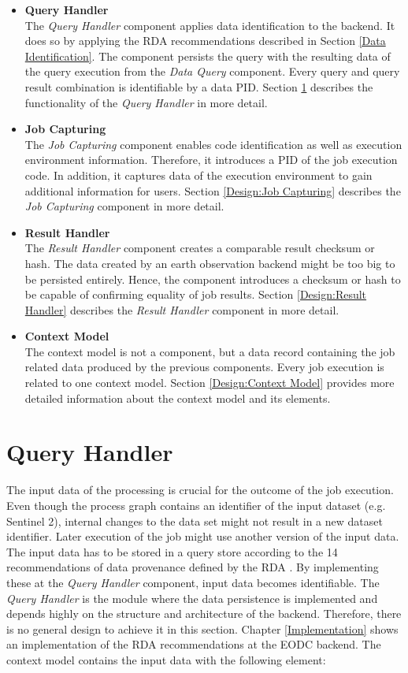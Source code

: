 \documentclass[draft,final]{vutinfth} %
\begin{document}
 \begin{itemize}
	\item \textbf{Query Handler} \\
	The \textit{Query Handler} component applies data identification to the backend. It does so by applying the RDA recommendations described in Section \ref{Data Identification}. The component persists the query with the resulting data of the query execution from the \textit{Data Query} component. Every query and query result combination is identifiable by a data PID. Section \ref{Design:Data Identification} describes the functionality of the \textit{Query Handler} in more detail.     
	\item \textbf{Job Capturing} \\ 
	The \textit{Job Capturing} component enables code identification as well as execution environment information. Therefore, it introduces a PID of the job execution code. In addition, it captures data of the execution environment to gain additional information for users. Section \ref{Design:Job Capturing} describes the \textit{Job Capturing} component in more detail.
	\item \textbf{Result Handler} \\
	The \textit{Result Handler} component creates a comparable result checksum or hash. The data created by an earth observation backend might be too big to be persisted entirely. Hence, the component introduces a checksum or hash to be capable of confirming equality of job results. Section \ref{Design:Result Handler} describes the \textit{Result Handler} component in more detail.   
	\item \textbf{Context Model} \\ 
	The context model is not a component, but a data record containing the job related data produced by the previous components. Every job execution is related to one context model. Section \ref{Design:Context Model} provides more detailed information about the context model and its elements. 
\end{itemize}

\section{Query Handler}\label{Design:Data Identification}
The input data of the processing is crucial for the outcome of the job execution. Even though the process graph contains an identifier of the input dataset (e.g. Sentinel 2), internal changes to the data set might not result in a new dataset identifier. Later execution of the job might use another version of the input data. The input data has to be stored in a query store according to the 14 recommendations of data provenance defined by the RDA \cite{rauber2016identification}. By implementing these at the \textit{Query Handler} component, input data becomes identifiable. The \textit{Query Handler} is the module where the data persistence is implemented and depends highly on the structure and architecture of the backend. Therefore, there is no general design to achieve it in this section. Chapter \ref{Implementation} shows an implementation of the RDA recommendations at the EODC backend. The context model contains the input data with the following element: 
\end{document}

